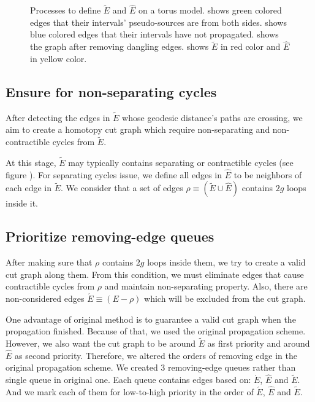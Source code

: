 \documentclass[a4paper,twoside]{article}
\begin{document}
\begin{figure}[h!]
	\caption[]{Processes to define $\tilde{E}$ and $\hat{E}$ on a torus model.  shows green colored edges that their intervals' pseudo-sources are from both sides.  shows blue colored edges that their intervals have not propagated.  shows the graph after removing dangling edges.  shows $\tilde{E}$ in red color and $\hat{E}$ in  yellow color.}
	\label{fig:fig-torus_edges_detected}
\end{figure}

\subsection{Ensure for non-separating cycles}
\label{subsec:ensure non-trivia}
After detecting the edges in $\tilde{E}$ whose geodesic distance's paths are crossing, we aim to create a homotopy cut graph which require non-separating and non-contractible cycles from $\tilde{E}$.

At this stage, $\tilde{E}$ may typically contains separating or contractible cycles (see figure ).  For separating cycles issue, we define all edges in $\hat{E}$ to be neighbors of each edge in $\tilde{E}$. We consider that a set of edges $\rho \equiv (\tilde{E} \cup \hat{E})$ contains $2g$ loops inside it.  

\subsection{Prioritize removing-edge queues}
After making sure that $\rho$ contains $2g$ loops inside them, we try to create a valid cut graph along them. From this condition, we must eliminate edges that cause contractible cycles from $\rho$ and maintain non-separating property. Also, there are non-considered edges $\acute{E} \equiv (E - \rho)$ which will be excluded from the cut graph.

One advantage of original method is to guarantee a valid cut graph when the propagation finished. Because of that, we used the original propagation scheme. However, we also want the cut graph to be around $\tilde{E}$ as first priority and around $\hat{E}$ as second priority. Therefore, we altered the orders of removing edge in the original propagation scheme. We created 3 removing-edge queues rather than single queue in original one. Each queue contains edges based on: 
$\acute{E}$, $\hat{E}$ and $\tilde{E}$.  And we mark each of them for low-to-high priority in the order of $\acute{E}$, $\hat{E}$ and $\tilde{E}$.
\end{document}
